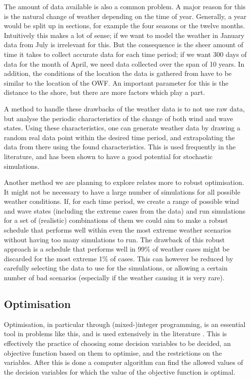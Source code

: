 \documentclass[a4paper,12pt]{article}
\begin{document}
The amount of data available is also a common problem. A major reason for this is the natural change of weather depending on the time of year. Generally, a year would be split up in sections, for example the four seasons or the twelve months. Intuitively this makes a lot of sense; if we want to model the weather in January data from July is irrelevant for this. But the consequence is the sheer amount of time it takes to collect accurate data for each time period; if we want 300 days of data for the month of April, we need data collected over the span of 10 years. In addition, the conditions of the location the data is gathered from have to be similar to the location of the OWF. An important parameter for this is the distance to the shore, but there are more factors which play a part. 

A method to handle these drawbacks of the weather data is to not use raw data, but analyse the periodic characteristics of the change of both wind and wave states. Using these characteristics, one can generate weather data by drawing a random real data point within the desired time period, and extrapolating the data from there using the found characteristics. This is used frequently in the literature, and has been shown to have a good potential for stochastic simulations. 

Another method we are planning to explore relates more to robust optimisation. It might not be necessary to have a large number of simulations for all possible weather conditions. If, for each time period, we create a range of possible wind and wave states (including the extreme cases from the data) and run simulations for a set of (realistic) combinations of them we could aim to make a robust schedule that performs well within even the most extreme weather scenarios without having too many simulations to run. The drawback of this robust approach is a schedule that performs well in 99\% of weather cases might be discarded for the most extreme 1\% of cases. This can however be reduced by carefully selecting the data to use for the simulations, or allowing a certain number of bad scenarios (especially if the weather causing it is very rare).


\subsection{Optimisation} \label{ss:opt}
Optimisation, in particular through (mixed-)integer programming, is an essential tool in problems like this, and is used extensively in the literature \cite{nemhauser1999integer,lee2011mixed}. This is effectively the practice of choosing some decision variables to be decided, an objective function based on them to optimise, and the restrictions on the variables. After this is done a computer algorithm can find the allowed values of the decision variables for which the value of the objective function is optimal. 
\end{document}
